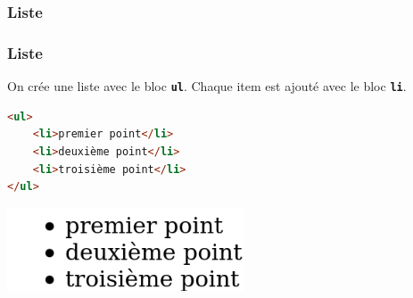 \documentclass[svgnames,11pt]{beamer}
\begin{document}
\subsubsection{Liste}
\begin{frame}[fragile]
    \frametitle{Liste}
    On crée une liste avec le bloc \textbf{\texttt{ul}}. Chaque item est ajouté avec le bloc \textbf{\texttt{li}}.
    \begin{center}
        \begin{lstlisting}[language=html , basicstyle=\ttfamily\small, xleftmargin=2em, xrightmargin=2em]
<ul>
    <li>premier point</li>
    <li>deuxième point</li>
    <li>troisième point</li>
</ul>
\end{lstlisting}
    \end{center}
    \begin{center}
        \centering
        \includegraphics[width=7cm]{ressources/liste.png}
    \end{center}
\end{frame}
\end{document}
